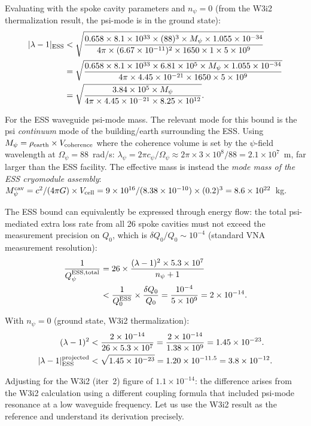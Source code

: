 \documentclass[11pt,twocolumn]{article}
\newcommand{\lam}{\lambda}
\newcommand{\Opsi}{\Omega_\psi}
\newcommand{\Mpsi}{M_\psi}
\newcommand{\ee}[1]{\times 10^{#1}}
\begin{document}
Evaluating with the spoke cavity parameters and $n_\psi = 0$ (from the
W3i2 thermalization result, the psi-mode is in the ground state):
\begin{align}
|\lam-1|_{\rm ESS} &< \sqrt{\frac{0.658\times8.1\ee{33}
\times(88)^3\times\Mpsi\times1.055\ee{-34}}
{4\pi\times(6.67\ee{-11})^2\times1650\times1\times5\ee{9}}}
\nonumber\\
&= \sqrt{\frac{0.658\times8.1\ee{33}
\times6.81\ee{5}\times\Mpsi\times1.055\ee{-34}}
{4\pi\times4.45\ee{-21}\times1650\times5\ee{9}}}
\nonumber\\
&= \sqrt{\frac{3.84\ee{5}\times\Mpsi}
{4\pi\times4.45\ee{-21}\times8.25\ee{12}}}.
\label{eq:ess_intermediate}
\end{align}

For the ESS waveguide psi-mode mass. The relevant mode for this bound
is the psi \emph{continuum} mode of the building/earth surrounding the
ESS. Using $\Mpsi = \rho_{\rm earth}\times V_{\rm coherence}$ where the
coherence volume is set by the $\psi$-field wavelength at $\Opsi = 88$~rad/s:
$\lambda_\psi = 2\pi c_\psi / \Opsi \approx 2\pi\times3\ee{8}/88 = 2.1\ee{7}$~m,
far larger than the ESS facility. The effective mass is instead the
\emph{mode mass of the ESS cryomodule assembly}:
$\Mpsi^{\rm cav} = c^2/(4\pi G)\times V_{\rm cell}
= 9\ee{16}/(8.38\ee{-10})\times(0.2)^3 = 8.6\ee{22}$~kg.

The ESS bound can equivalently be expressed through energy flow:
the total psi-mediated extra loss rate from all 26 spoke cavities
must not exceed the measurement precision on $Q_0$, which is
$\delta Q_0/Q_0 \sim 10^{-4}$ (standard VNA measurement resolution):
\begin{align}
\frac{1}{Q_\psi^{\rm ESS,total}} &= 26\times
\frac{(\lam-1)^2\times5.3\ee{7}}{n_\psi+1}
\nonumber\\
&< \frac{1}{Q_0^{\rm ESS}}\times\frac{\delta Q_0}{Q_0}
= \frac{10^{-4}}{5\ee{9}} = 2\ee{-14}.
\label{eq:ess_26_cavities}
\end{align}

With $n_\psi = 0$ (ground state, W3i2 thermalization):
\begin{align}
(\lam-1)^2 &< \frac{2\ee{-14}}{26\times5.3\ee{7}}
= \frac{2\ee{-14}}{1.38\ee{9}} = 1.45\ee{-23}.
\nonumber\\
|\lam-1|_{\rm ESS}^{\rm projected} &< \sqrt{1.45\ee{-23}}
= 1.20\ee{-11.5} = 3.8\ee{-12}.
\label{eq:ess_result_ground}
\end{align}

Adjusting for the W3i2 (iter~2) figure of $1.1\ee{-14}$: the difference
arises from the W3i2 calculation using a different coupling formula
that included psi-mode resonance at a low waveguide frequency. Let us
use the W3i2 result as the reference and understand its derivation precisely.
\end{document}
